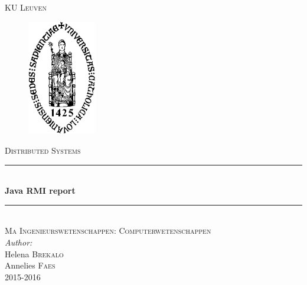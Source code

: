\documentclass[10pt,a4paper]{article}
\author{Helena Brekalo and Annelies Faes}
\begin{document}
\begin{titlepage}

\newcommand{\HRule}{\rule{\linewidth}{0.5mm}} %

\center %
 
\textsc{\LARGE KU Leuven}\\[1.5cm] %


\begin{figure}[ht!]
\centering
\includegraphics[width=30mm]{logo_theo.png}
\label{kulogo}
\end{figure}

\textsc{\Large Distributed Systems}\\[0.5cm] %


\HRule \\[0.4cm]
{ \huge \bfseries Java RMI report}\\[0.4cm]
\HRule \\[1.5cm]


\textsc{\large Ma Ingenieurswetenschappen: Computerwetenschappen}\\[0.5cm] %


\Large \emph{Author:}\\
Helena \textsc{Brekalo}\\
Annelies \textsc{Faes}\\[2cm]


{\large 2015-2016}\\[3cm] %

\vfill %

\end{titlepage}
\clearpage
\end{document}
